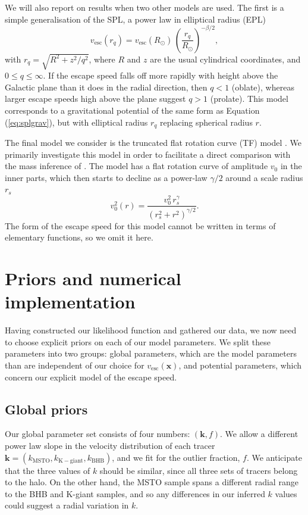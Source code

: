 \documentclass[useAMS,twocolumn,usenatbib]{mn2e}
\def\vesc{{v_\mathrm{esc}}}
\def\pos{{\boldsymbol{x}}}
\begin{document}
We will also report on results when two other models are used. The first is a simple 
generalisation of the SPL, a power law in elliptical radius (EPL)
%
\begin{equation}
\vesc(r_q) = \vesc(R_\odot)\,\left(\dfrac{r_q}{R_\odot}\right)^{-\beta/2},
\end{equation}
%
with $r_q = \sqrt{R^2 + z^2/q^2}$, where $R$ and $z$ are the usual
cylindrical coordinates, and $0 \leq q \leq \infty$. If the escape
speed falls off more rapidly with height above the Galactic plane than
it does in the radial direction, then $q<1$ (oblate), whereas larger
escape speeds high above the plane suggest $q>1$ (prolate). This model
corresponds to a gravitational potential of the same form as Equation
(\ref{eq:splgrav}), but with elliptical radius $r_q$ replacing
spherical radius $r$.

The final model we consider is the truncated flat rotation curve (TF)
model \citep[see][]{Gi14,Wi99}. We primarily investigate this model in
order to facilitate a direct comparison with the mass inference of
\citet{Gi14}.  The model has a flat rotation curve of amplitude $v_0$
in the inner parts, which then starts to decline as a power-law
$\gamma/2$ around a scale radius $r_s$
%
\begin{equation}
v_0^2(r) = \dfrac{v_0^2\,r_s^\gamma}{(r_s^2 + r^2)^{\gamma/2}}.
\end{equation}
%
The form of the escape speed for this model cannot be written in terms
of elementary functions, so we omit it here.

\section{Priors and numerical implementation}

\label{sec:pannm}

Having constructed our likelihood function and gathered our data, we
now need to choose explicit priors on each of our model parameters. We
split these parameters into two groups: global parameters, which are
the model parameters than are independent of our choice for
$\vesc(\pos)$, and potential parameters, which concern our explicit
model of the escape speed.

\subsection{Global priors}

Our global parameter set consists of four numbers:
$(\boldsymbol{k},f)$. We allow a different power law slope in the
velocity distribution of each tracer $\boldsymbol{k} =
(k_\mathrm{MSTO},k_\mathrm{K-giant},k_\mathrm{BHB})$, and we fit for
the outlier fraction, $f$. We anticipate that the three values of $k$
should be similar, since all three sets of tracers belong to the halo.
On the other hand, the MSTO sample spans a different radial range to
the BHB and K-giant samples, and so any differences in our inferred
$k$ values could suggest a radial variation in $k$.
\end{document}
